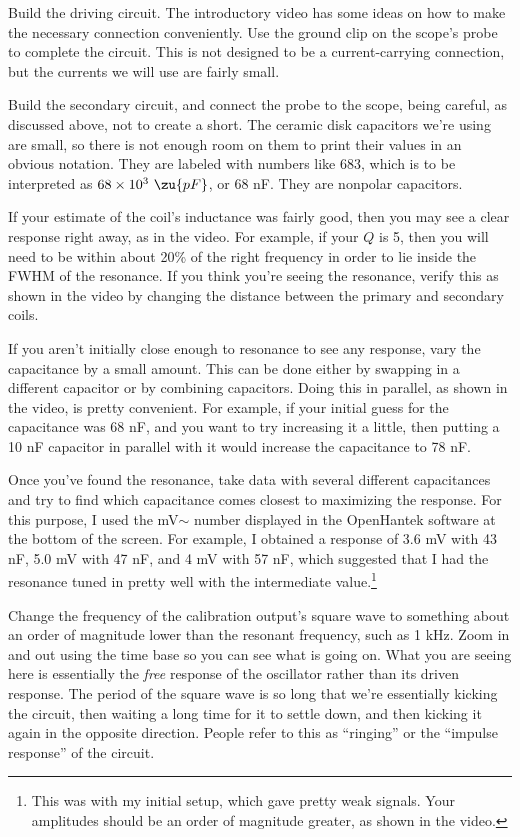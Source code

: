 Build the driving circuit. The introductory video has some ideas on how to
make the necessary connection conveniently.
Use the ground clip on the scope's probe to complete the circuit.
This is not designed to be a current-carrying connection, but the
currents we will use are fairly small.

Build the secondary circuit, and connect the probe to the scope,
being careful, as discussed above, not to create a short. The ceramic
disk capacitors we're using are small, so there is not enough room
on them to print their values in an obvious notation. They are labeled
with numbers like 683, which is to be interpreted as $68\times10^3\ \zu{pF}$,
or 68 nF. They are nonpolar capacitors.

If your estimate of the coil's inductance was fairly good, then you
may see a clear response right away, as in the video. For example,
if your $Q$ is 5, then you will need to be within about 20\% of
the right frequency in order to lie inside the FWHM of the resonance.
If you think you're seeing the resonance, verify this as shown
in the video by changing the distance between the primary and
secondary coils.

If you aren't initially close enough to resonance
to see any response, vary the capacitance by a small amount. This
can be done either by swapping in a different capacitor or by
combining capacitors. Doing this in parallel, as shown in the video,
is pretty convenient. For example, if your initial guess for the
capacitance was 68 nF, and you want to try increasing it a little,
then putting a 10 nF capacitor in parallel with it would increase
the capacitance to 78 nF.

Once you've found the resonance, take data with several different
capacitances and try to find which capacitance comes closest to
maximizing the response. For this purpose, I used the mV$\sim$ number
displayed in the OpenHantek software at the bottom of the screen.
For example, I obtained a response of 3.6 mV with 43 nF,
5.0 mV with 47 nF, and 4 mV with 57 nF, which suggested that I
had the resonance tuned in pretty well with the intermediate
value.\footnote{This was with my initial setup, which gave pretty weak
signals. Your amplitudes should be an order of magnitude greater,
as shown in the video.}


Change the frequency of the calibration output's square wave to something about an order
of magnitude lower than the resonant frequency, such as 1 kHz. Zoom in and out using the
time base so you can see what is going on. What you are seeing here is essentially the
\emph{free} response of the oscillator rather than its driven response. The period of the square wave is
so long that we're essentially kicking the circuit, then waiting a long time for it to settle down,
and then kicking it again in the opposite direction. People refer to this as ``ringing''
or the ``impulse response'' of the circuit.

